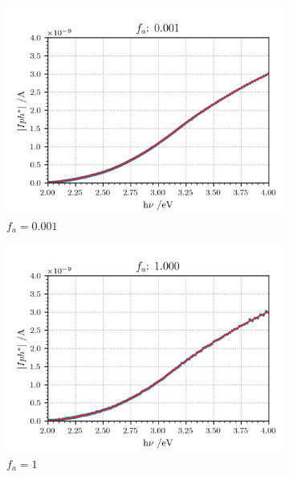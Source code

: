 \documentclass[10pt, 3p, sort&compress]{elsarticle}
\newcommand{\coef}{0.1}
\begin{document}
\renewcommand{\coef}{0.3}
\begin{figure}[htbp]
	\centering
	\begin{subfigure}{\coef\textwidth}
		\centering
	 	\includegraphics[width=\textwidth]{DSS_0mV_data-Iph-0001x.png}
	 	\caption{$f_a=0.001$}
	 	\label{fig:fa0001}
	\end{subfigure}
	\begin{subfigure}{\coef\textwidth}
		\centering
	 	\includegraphics[width=\textwidth]{DSS_0mV_data-Iph-1x.png}
	 	\caption{$f_a=1$}
	 	\label{fig:fa1}
	\end{subfigure}
	\begin{subfigure}{\coef\textwidth}
		\centering

\end{subfigure}
\end{figure}
\end{document}
